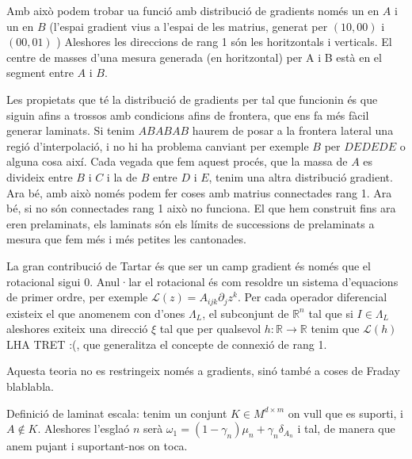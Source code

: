 Amb això podem trobar ua funció amb distribució de gradients només un en $A$ i un en $B$ (l'espai gradient vius a l'espai de les matrius, generat per $(1 0, 0 0)$ i $(0 0, 0 1)$ ) Aleshores les direccions de rang 1 són les horitzontals i verticals. El centre de masses d'una mesura generada (en horitzontal) per A i B està en el segment entre $A$ i $B$.

Les propietats que té la distribució de gradients per tal que funcionin és que siguin afins a trossos amb condicions afins de frontera, que ens fa més fàcil generar laminats. Si tenim $ABABAB$ haurem de posar a la frontera lateral una regió d'interpolació, i no hi ha problema canviant per exemple $B$ per $DEDEDE$ o alguna cosa així. Cada vegada que fem aquest procés, que la massa de $A$ es divideix entre $B$ i $C$ i la de $B$ entre $D$ i $E$, tenim una altra distribució gradient. 
Ara bé, amb això només podem fer coses amb matrius connectades rang 1. Ara bé, si no són connectades rang 1 això no funciona. El que hem construit fins ara eren prelaminats, els laminats són els límits de successions de prelaminats a mesura que fem més i més petites les cantonades.

La gran contribució de Tartar és que ser un camp gradient és només que el rotacional sigui 0. Anul·lar el rotacional és com resoldre un sistema d'equacions de primer ordre, per exemple $\mathcal L(z) = A_{ijk}\partial_j z^k$. Per cada operador diferencial existeix el que anomenem con d'ones $\Lambda_L$, el subconjunt de $\mathbb R^n$ tal que si $I\in\Lambda_L$ aleshores exiteix una direcció $\xi$ tal que per qualsevol $h:\mathbb R\to \mathbb R$ tenim que $\mathcal L(h)$ LHA TRET :(, que generalitza el concepte de connexió de rang 1.

Aquesta teoria no es restringeix només a gradients, sinó també a coses de Fraday blablabla.

Definició de laminat escala: tenim un conjunt $K\in M^{d\times m}$ on vull que es suporti, i $A\not\in K$. Aleshores l'esglaó $n$ serà $\omega_1=(1-\gamma_n)\mu_n+\gamma_n\delta_{A_n}$ i tal, de manera que anem pujant i suportant-nos on toca.











\newpage
